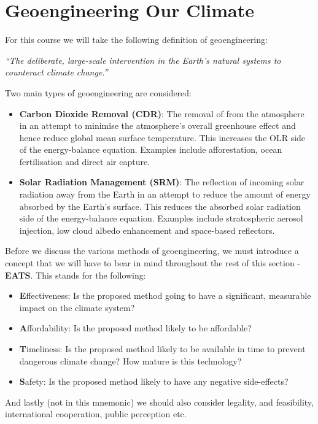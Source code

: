 \section{Geoengineering Our Climate}
\label{sec:geoengineering}

For this course we will take the following definition of geoengineering:
\begin{tcolorbox}
    \centering
    \textit{``The deliberate, large-scale intervention in the 
    Earth's natural systems to counteract climate change.''}
\end{tcolorbox}

Two main types of geoengineering are considered:
\begin{itemize}
    \item \textbf{Carbon Dioxide Removal (CDR)}: The removal of  from 
    the atmosphere in an attempt to minimise the atmosphere's overall greenhouse
    effect and hence reduce global mean surface temperature. This increases the
    OLR side of the energy-balance equation. Examples include afforestation,
    ocean fertilisation and direct air capture.
    \item \textbf{Solar Radiation Management (SRM)}: The reflection of incoming
    solar radiation away from the Earth in an attempt to reduce the amount of
    energy absorbed by the Earth's surface. This reduces the absorbed solar
    radiation side of the energy-balance equation. Examples include stratospheric
    aerosol injection, low cloud albedo enhancement and space-based reflectors.
\end{itemize}

Before we discuss the various methods of geoengineering, we must introduce a 
concept that we will have to bear in mind throughout the rest of this section - 
\textbf{EATS}. This stands for the following:

\begin{itemize}
    \item \textbf{E}ffectiveness: Is the proposed method going to have a significant,
    measurable impact on the climate system?
    \item \textbf{A}ffordability: Is the proposed method likely to be affordable?
    \item \textbf{T}imeliness: Is the proposed method likely to be available in
    time to prevent dangerous climate change? How mature is this technology?
    \item \textbf{S}afety: Is the proposed method likely to have any negative
    side-effects?
\end{itemize}
And lastly (not in this mnemonic) we should also consider legality, and feasibility,
international cooperation, public perception etc.


